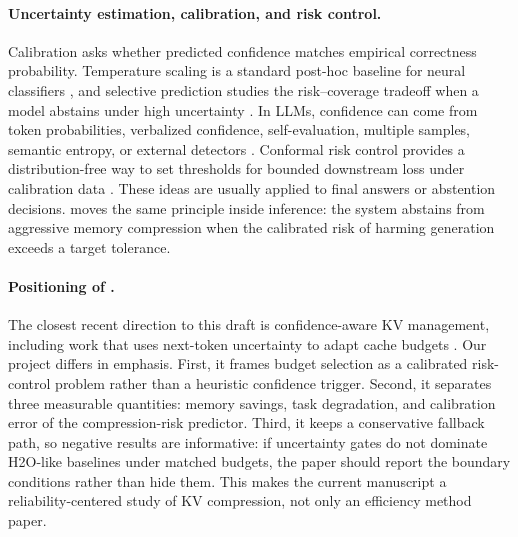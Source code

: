 \paragraph{Uncertainty estimation, calibration, and risk control.}
Calibration asks whether predicted confidence matches empirical correctness probability. Temperature scaling is a standard post-hoc baseline for neural classifiers \citep{guo2017calibration}, and selective prediction studies the risk--coverage tradeoff when a model abstains under high uncertainty \citep{geifman2017selective}. In LLMs, confidence can come from token probabilities, verbalized confidence, self-evaluation, multiple samples, semantic entropy, or external detectors \citep{kadavath2022language,farquhar2024detecting,manakul2023selfcheckgpt,geng2024survey}. Conformal risk control provides a distribution-free way to set thresholds for bounded downstream loss under calibration data \citep{angelopoulos2024conformal}. These ideas are usually applied to final answers or abstention decisions. \uckv{} moves the same principle inside inference: the system abstains from aggressive memory compression when the calibrated risk of harming generation exceeds a target tolerance.

\paragraph{Positioning of \uckv{}.}
The closest recent direction to this draft is confidence-aware KV management, including work that uses next-token uncertainty to adapt cache budgets \citep{li2026confkv}. Our project differs in emphasis. First, it frames budget selection as a calibrated risk-control problem rather than a heuristic confidence trigger. Second, it separates three measurable quantities: memory savings, task degradation, and calibration error of the compression-risk predictor. Third, it keeps a conservative fallback path, so negative results are informative: if uncertainty gates do not dominate H2O-like baselines under matched budgets, the paper should report the boundary conditions rather than hide them. This makes the current manuscript a reliability-centered study of KV compression, not only an efficiency method paper.
